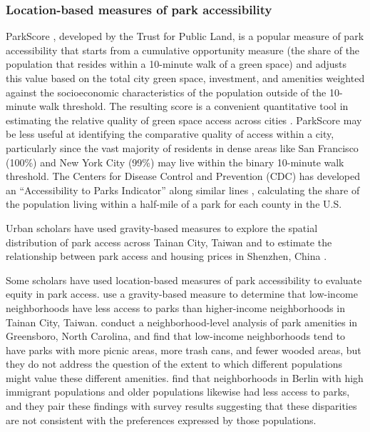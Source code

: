 \documentclass[3p, authoryear, review]{elsarticle} %
\begin{document}
\hypertarget{location-based-measures-of-park-accessibility}{%
\subsubsection{Location-based measures of park accessibility}\label{location-based-measures-of-park-accessibility}}

ParkScore \citep{parkscore2019}, developed by the Trust for Public Land, is a popular
measure of park accessibility that starts from a cumulative opportunity measure
(the share of the population that resides within a 10-minute walk of a green
space) and adjusts this value based on the total city green space, investment,
and amenities weighted against the socioeconomic characteristics of the
population outside of the 10-minute walk threshold. The resulting score is a
convenient quantitative tool in estimating the relative quality of green space
access across cities \citep{Rigolon2018}. ParkScore may be less useful at identifying
the comparative quality of access within a city, particularly since the vast
majority of residents in dense areas like San Francisco (100\%) and New York City
(99\%) may live within the binary 10-minute walk threshold. The Centers for
Disease Control and Prevention (CDC) has developed an ``Accessibility to Parks
Indicator'' along similar lines \citep{Ussery2016}, calculating the share of the
population living within a half-mile of a park for each county in the U.S.

Urban scholars have used gravity-based measures to explore the
spatial distribution of park access across Tainan City, Taiwan
\citep{chang2011exploring} and to estimate the relationship between park access and
housing prices in Shenzhen, China \citep{wu2017spatial}.

Some scholars have used location-based measures of park accessibility to
evaluate equity in park access. \citet{chang2011exploring} use a gravity-based measure
to determine that low-income neighborhoods have less access to parks than
higher-income neighborhoods in Tainan City, Taiwan. \citet{bruton2014disparities}
conduct a neighborhood-level analysis of park amenities in Greensboro, North
Carolina, and find that low-income neighborhoods tend to have parks with more
picnic areas, more trash cans, and fewer wooded areas, but they do not address
the question of the extent to which different populations might value these
different amenities. \citet{kabisch2014green} find that neighborhoods in Berlin with
high immigrant populations and older populations likewise had less access to
parks, and they pair these findings with survey results suggesting that these
disparities are not consistent with the preferences expressed by those
populations.
\end{document}
